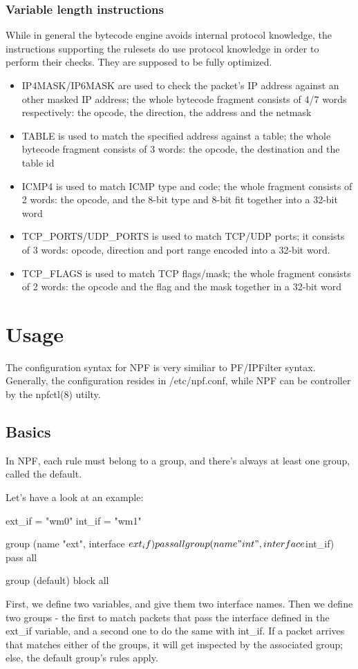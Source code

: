 \documentclass[11pt,twocolumn]{article}
\begin{document}
\subsubsection{Variable length instructions}
While in general the bytecode engine avoids internal protocol knowledge, the instructions
supporting the rulesets do use protocol knowledge in order to perform their checks. They
are supposed to be fully optimized.
\begin{itemize}
	\item IP4MASK/IP6MASK are used to check the packet's IP address against
an other masked IP address; the whole bytecode fragment consists of 4/7 words respectively: the opcode, the
direction, the address and the netmask
	\item TABLE is used to match the specified address against a table; the whole bytecode
fragment consists of 3 words: the opcode, the destination and the table id
	\item ICMP4 is used to match ICMP type and code; the whole fragment consists of 2 words:
the opcode, and the 8-bit type and 8-bit fit together into a 32-bit word
	\item TCP\_PORTS/UDP\_PORTS is used to match TCP/UDP ports; it consists of 3 words: opcode,
direction and port range encoded into a 32-bit word.
	\item TCP\_FLAGS is used to match TCP flags/mask; the whole fragment consists of 2 words:
the opcode and the flag and the mask together in a 32-bit word
\end{itemize}

\section{Usage}
The configuration syntax for NPF is very similiar to PF/IPFilter syntax. Generally, the configuration
resides in /etc/npf.conf, while NPF can be controller by the npfctl(8) utilty.
\subsection{Basics}
In NPF, each rule must belong to a group, and there's always at least
one group, called the default.

Let's have a look at an example:
\begin{verbatimtab}[8]
ext_if = "wm0"
int_if = "wm1"

group (name "ext", interface $ext_if) {
	pass all
}

group (name "int", interface $int_if) {
	pass all
}

group (default) {
	block all
}
\end{verbatimtab}
First, we define two variables, and give them two interface names. Then
we define two groups - the first to match packets that pass the interface defined
in the ext\_if variable, and a second one to do the same with int\_if. If a packet
arrives that matches either of the groups, it will get inspected by the associated group; else,
the default group's rules apply.
\end{document}
